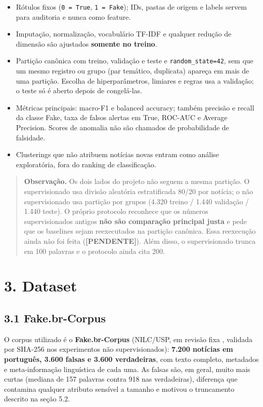 \documentclass[
  brazilian,
  11pt,
]{article}
\providecommand{\tightlist}{%
  \setlength{\itemsep}{0pt}\setlength{\parskip}{0pt}}
\begin{document}
\begin{itemize}
\tightlist
\item
  Rótulos fixos (\texttt{0\ =\ True}, \texttt{1\ =\ Fake}); IDs, pastas de origem e labels servem para auditoria e nunca como feature.
\item
  Imputação, normalização, vocabulário TF-IDF e qualquer redução de dimensão são ajustados \textbf{somente no treino}.
\item
  Partição canônica com treino, validação e teste e \texttt{random\_state=42}, sem que um mesmo registro ou grupo (par temático, duplicata) apareça em mais de uma partição. Escolha de hiperparâmetros, limiares e regras usa a validação; o teste só é aberto depois de congelá-las.
\item
  Métricas principais: macro-F1 e balanced accuracy; também precisão e recall da classe Fake, taxa de falsos alertas em True, ROC-AUC e Average Precision. Scores de anomalia não são chamados de probabilidade de falsidade.
\item
  Clusterings que não atribuem notícias novas entram como análise exploratória, fora do ranking de classificação.
\end{itemize}

\begin{quote}
\textbf{Observação.} Os dois lados do projeto não seguem a mesma partição. O supervisionado usa divisão aleatória estratificada 80/20 por notícia; o não supervisionado usa partição por grupos (4.320 treino / 1.440 validação / 1.440 teste). O próprio protocolo reconhece que os números supervisionados antigos \textbf{não são comparação principal justa} e pede que os baselines sejam reexecutados na partição canônica. Essa reexecução ainda não foi feita (\textbf{{[}PENDENTE{]}}). Além disso, o supervisionado trunca em 100 palavras e o protocolo ainda cita 200.
\end{quote}

\section{3. Dataset}\label{dataset}

\subsection{3.1 Fake.br-Corpus}\label{fake.br-corpus}

O corpus utilizado é o \textbf{Fake.br-Corpus} (NILC/USP, em revisão fixa , validada por SHA-256 nos experimentos não supervisionados): \textbf{7.200 notícias em português, 3.600 falsas e 3.600 verdadeiras}, com texto completo, metadados e meta-informação linguística de cada uma. As falsas são, em geral, muito mais curtas (mediana de 157 palavras contra 918 nas verdadeiras), diferença que contamina qualquer atributo sensível a tamanho e motivou o truncamento descrito na seção 5.2.
\end{document}

